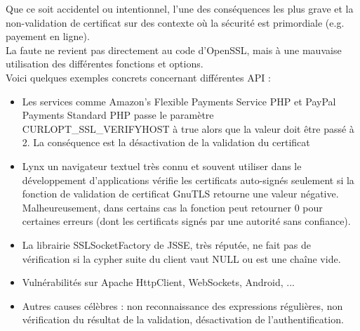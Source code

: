 			Que ce soit accidentel ou intentionnel, l'une des conséquences 
			les plus grave et la non-validation de certificat
			sur des contexte où la sécurité est primordiale (e.g. 
			payement en ligne).\\
			
			La faute ne revient pas directement au code d'OpenSSL, mais à une
			mauvaise utilisation des différentes fonctions et options.\\
			
			Voici quelques exemples concrets concernant différentes API : 
			\begin{itemize}
			\item Les services comme Amazon's Flexible Payments Service PHP 
			et PayPal Payments Standard PHP passe le paramètre
			CURLOPT\_SSL\_VERIFYHOST à true alors que la valeur doit être 
			passé à 2.
			La conséquence est la désactivation de la validation du certificat
			
			\item Lynx un navigateur textuel très connu et souvent utiliser dans
			le développement d'applications vérifie les certificats auto-signés
			seulement si la fonction de validation de certificat GnuTLS retourne
			une valeur négative. Malheureusement, dans certains cas la fonction
			peut retourner 0 pour certaines erreurs (dont les certificats signés
			par une autorité sans confiance).
			
			\item La librairie SSLSocketFactory de JSSE, très réputée, ne fait pas
			de vérification si la cypher suite du client vaut NULL ou est une 
			chaîne vide.
			
			\item Vulnérabilités sur Apache HttpClient, WebSockets, Android, ...
			
			\item Autres causes célèbres : non reconnaissance des expressions
			régulières, non vérification du résultat de la validation, 
			désactivation de l'authentification.\\
			\end{itemize}
			
